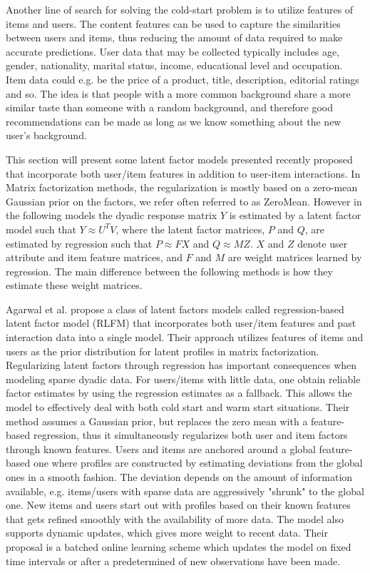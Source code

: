 Another line of search for solving the cold-start problem is to utilize
features of items and users. The content features can be used to capture the
similarities between users and items, thus reducing the amount of data required
to make accurate predictions. User data that may be collected typically
includes age, gender, nationality, marital status, income, educational level
and occupation. Item data could e.g. be the price of a product, title,
description, editorial ratings and so. The idea is that people with a more
common background share a more similar taste than someone with a random
background, and therefore good recommendations can be made as long as we know
something about the new user’s background.

This section will present some latent factor models presented recently proposed
that incorporate both user/item features in addition to user-item interactions.
In Matrix factorization methods, the regularization is mostly based on a
zero-mean Gaussian prior on the factors, we refer often referred to as
ZeroMean. However in the following models the dyadic response matrix $Y$ is
estimated by a latent factor model such that $Y \approx U^{T}V$, where the
latent factor matrices, $P$ and $Q$, are estimated by regression such that $P
\approx FX$ and $Q \approx MZ$. $X$ and $Z$ denote user attribute and item
feature matrices, and $F$ and $M$ are weight matrices learned by regression.
The main difference between the following methods is how they estimate these
weight matrices.


Agarwal et al. \cite{Agarwal2009} propose a class of latent factors models
called regression-based latent factor model (RLFM) that incorporates both
user/item features and past interaction data into a single model. Their
approach utilizes features of items and users as the prior distribution for
latent profiles in matrix factorization. Regularizing latent factors through
regression has important consequences when modeling sparse dyadic data. For
users/items with little data, one obtain reliable factor estimates by using the
regression estimates as a fallback. This allows the model to effectively deal
with both cold start and warm start situations. Their method assumes a Gaussian
prior, but replaces the zero mean with a feature-based regression, thus it
simultaneously regularizes both user and item factors through known features.
Users and items are anchored around a global feature-based one where profiles
are constructed by estimating deviations from the global ones in a smooth
fashion. The deviation depends on the amount of information available, e.g.
items/users with sparse data are aggressively "shrunk" to the global one. New
items and users start out with profiles based on their known features that gets
refined smoothly with the availability of more data. The model also supports
dynamic updates, which gives more weight to recent data. Their proposal is a
batched online learning scheme which updates the model on fixed time intervals
or after a predetermined of new observations have been made.

